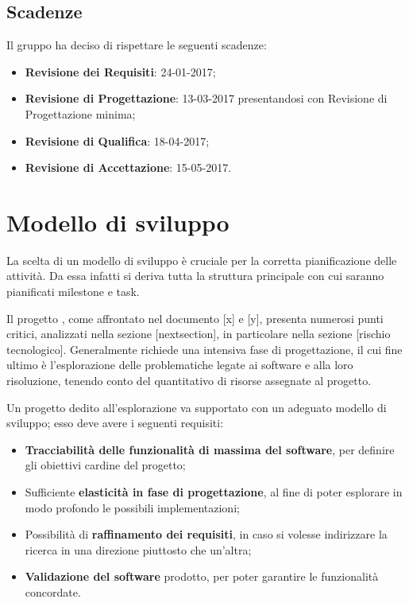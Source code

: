 	\subsection{Scadenze}
	Il gruppo \hx ha deciso di rispettare le seguenti scadenze:
		\begin{itemize}
			\item \textbf{Revisione dei Requisiti}: 24-01-2017;
			\item \textbf{Revisione di Progettazione}: 13-03-2017 presentandosi con Revisione di Progettazione minima;
			\item \textbf{Revisione di Qualifica}: 18-04-2017;
			\item \textbf{Revisione di Accettazione}: 15-05-2017.
		\end{itemize}


\section{Modello di sviluppo}

	La scelta di un modello di sviluppo è cruciale per la corretta pianificazione delle attività. Da essa infatti si deriva tutta la struttura principale con cui saranno pianificati milestone e task.

	Il progetto {\proj}, come affrontato nel documento [x] e [y], presenta numerosi punti critici, analizzati nella sezione [nextsection], in particolare nella sezione [rischio tecnologico]. Generalmente {\proj} richiede una intensiva fase di progettazione, il cui fine ultimo è l'esplorazione delle problematiche legate ai software  e alla loro risoluzione, tenendo conto del quantitativo di risorse assegnate al progetto. %

	Un progetto dedito all'esplorazione va supportato con un adeguato modello di sviluppo; esso deve avere i seguenti requisiti:

	\begin{itemize}
		\item \textbf{Tracciabilità delle funzionalità di massima del software}, per definire gli obiettivi cardine del progetto;
		\item Sufficiente \textbf{elasticità in fase di progettazione}, al fine di poter esplorare in modo profondo le possibili implementazioni;
		\item Possibilità di \textbf{raffinamento dei requisiti}, in caso si volesse indirizzare la ricerca in una direzione piuttosto che un'altra;
		\item \textbf{Validazione del software} prodotto, per poter garantire le funzionalità concordate.
	\end{itemize}

